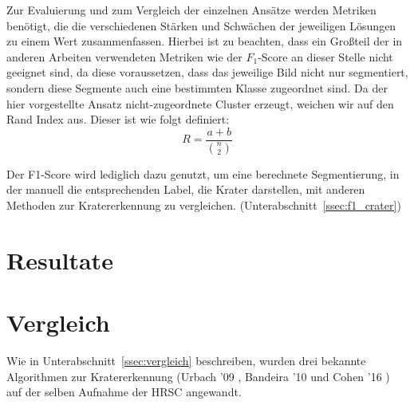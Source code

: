 Zur Evaluierung und zum Vergleich der einzelnen Ansätze werden Metriken benötigt, die die verschiedenen Stärken und Schwächen der jeweiligen Lösungen zu einem Wert zusammenfassen. Hierbei ist zu beachten, dass ein Großteil der in anderen Arbeiten verwendeten Metriken wie \bspw der $F_1$-Score an dieser Stelle nicht geeignet sind, da diese voraussetzen, dass das jeweilige Bild nicht nur segmentiert, sondern diese Segmente auch eine bestimmten Klasse zugeordnet sind. Da der hier vorgestellte Ansatz nicht-zugeordnete Cluster erzeugt, weichen wir auf den Rand Index\cite{randindex} aus. Dieser ist wie folgt definiert:
\[R=\frac{a+b}{\binom{n}{2}}\]

Der F1-Score wird lediglich dazu genutzt, um eine berechnete Segmentierung, in der manuell die entsprechenden Label, die Krater darstellen, mit anderen Methoden zur Kratererkennung zu vergleichen. (\vgl Unterabschnitt~\ref{ssec:f1_crater})

\section{Resultate}
\label{sec:resultate}

\section{Vergleich}
\label{sec:vergleich}

Wie in Unterabschnitt~\ref{ssec:vergleich} beschreiben, wurden drei bekannte Algorithmen zur Kratererkennung  (Urbach '09 \cite{urbach_stepinski_2009}, Bandeira '10 \cite{bandeira_10} und Cohen '16 \cite{cohen_16}) auf der selben Aufnahme der HRSC angewandt.

